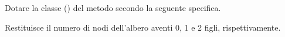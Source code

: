 Dotare la classe  () del metodo  secondo la seguente specifica.

\begin{methodslist}

 {
  Restituisce il numero di nodi dell'albero aventi 0, 1 e 2 figli, ris\-pet\-ti\-va\-men\-te.
}

\end{methodslist}